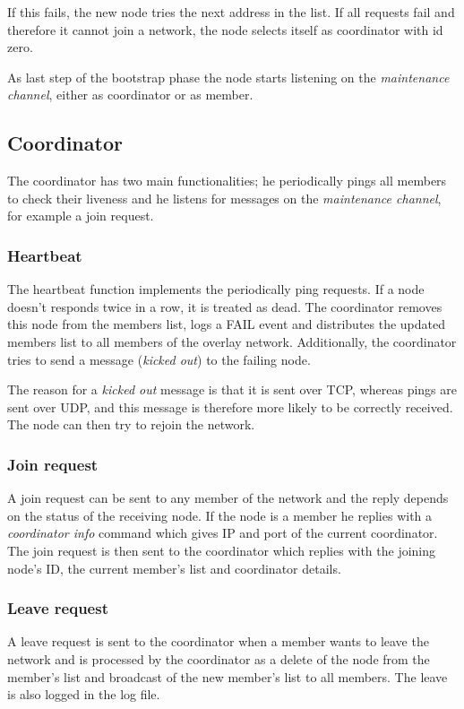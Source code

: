 \documentclass[paper=a4, fontsize=11pt]{scrartcl} %
\numberwithin{equation}{section} %
\numberwithin{figure}{section} %
\numberwithin{table}{section} %
\begin{document}
If this fails, the new node tries the next address in the list. If all requests fail and therefore it cannot join a network, the node selects itself as coordinator with id zero.

As last step of the bootstrap phase the node starts listening on the \textit{maintenance channel}, either as coordinator or as member.

\subsection{Coordinator}

The coordinator has two main functionalities; he periodically pings all members to check their liveness and he listens for messages on the \textit{maintenance channel}, for example a join request.

\subsubsection{Heartbeat}
The heartbeat function implements the periodically ping requests.
If a node doesn't responds twice in a row, it is treated as dead. The coordinator removes this node from the members list, logs a FAIL event and distributes the updated members list to all members of the overlay network. Additionally, the coordinator tries to send a message (\textit{kicked out}) to the failing node.

The reason for a \textit{kicked out} message is that it is sent over TCP, whereas pings are sent over UDP, and this message is therefore more likely to be correctly received. The node can then try to rejoin the network.

\subsubsection{Join request}
A join request can be sent to any member of the network and the reply depends on the status of the receiving node. If the node is a member he replies with a \textit{coordinator info} command which gives IP and port of the current coordinator. The join request is then sent to the coordinator which replies with the joining node's ID, the current member's list and coordinator details.

\subsubsection{Leave request}
A leave request is sent to the coordinator when a member wants to leave the network and is processed by the coordinator as a delete of the node from the member's list and broadcast of the new member's list to all members. The leave is also logged in the log file.
\end{document}
